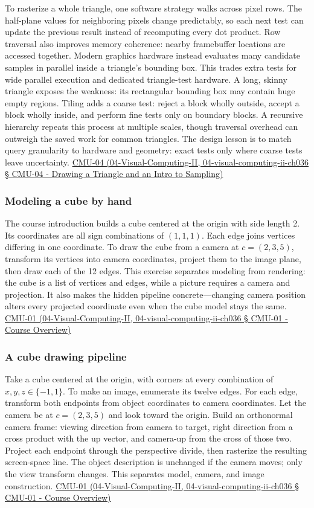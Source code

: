 To rasterize a whole triangle, one software strategy walks across pixel rows. The half-plane values for neighboring pixels change predictably, so each next test can update the previous result instead of recomputing every dot product. Row traversal also improves memory coherence: nearby framebuffer locations are accessed together. Modern graphics hardware instead evaluates many candidate samples in parallel inside a triangle's bounding box. This trades extra tests for wide parallel execution and dedicated triangle-test hardware. A long, skinny triangle exposes the weakness: its rectangular bounding box may contain huge empty regions. Tiling adds a coarse test: reject a block wholly outside, accept a block wholly inside, and perform fine tests only on boundary blocks. A recursive hierarchy repeats this process at multiple scales, though traversal overhead can outweigh the saved work for common triangles. The design lesson is to match query granularity to hardware and geometry: exact tests only where coarse tests leave uncertainty. \href{}{CMU-04 (04-Visual-Computing-II, 04-visual-computing-ii-ch036 § CMU-04 - Drawing a Triangle and an Intro to Sampling)}

\subsubsection{Modeling a cube by hand}\label{modeling-a-cube-by-hand}

The course introduction builds a cube centered at the origin with side length 2. Its coordinates are all sign combinations of \((1,1,1)\). Each edge joins vertices differing in one coordinate. To draw the cube from a camera at \(c=(2,3,5)\), transform its vertices into camera coordinates, project them to the image plane, then draw each of the 12 edges. This exercise separates modeling from rendering: the cube is a list of vertices and edges, while a picture requires a camera and projection. It also makes the hidden pipeline concrete---changing camera position alters every projected coordinate even when the cube model stays the same. \href{}{CMU-01 (04-Visual-Computing-II, 04-visual-computing-ii-ch036 § CMU-01 - Course Overview)}

\subsubsection{A cube drawing pipeline}\label{a-cube-drawing-pipeline}

Take a cube centered at the origin, with corners at every combination of \(x,y,z\in\{-1,1\}\). To make an image, enumerate its twelve edges. For each edge, transform both endpoints from object coordinates to camera coordinates. Let the camera be at \(c=(2,3,5)\) and look toward the origin. Build an orthonormal camera frame: viewing direction from camera to target, right direction from a cross product with the up vector, and camera-up from the cross of those two. Project each endpoint through the perspective divide, then rasterize the resulting screen-space line. The object description is unchanged if the camera moves; only the view transform changes. This separates model, camera, and image construction. \href{}{CMU-01 (04-Visual-Computing-II, 04-visual-computing-ii-ch036 § CMU-01 - Course Overview)}

